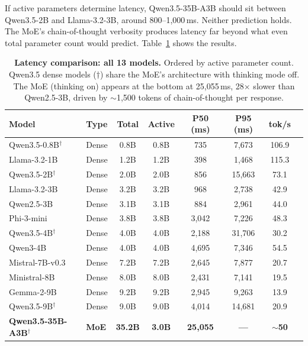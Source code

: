 \documentclass[11pt]{article}
\begin{document}
If active parameters determine latency, Qwen3.5-35B-A3B should sit between Qwen3.5-2B and Llama-3.2-3B, around 800--1,000\,ms.  Neither prediction holds.  The MoE's chain-of-thought verbosity produces latency far beyond what even total parameter count would predict.  Table~\ref{tab:latency-comparison} shows the results.

\begin{table}[t]
\centering
\caption{\textbf{Latency comparison: all 13 models.} Ordered by active parameter count.  Qwen3.5 dense models ($\dagger$) share the MoE's architecture with thinking mode off.  The MoE (thinking on) appears at the bottom at 25,055\,ms, 28$\times$ slower than Qwen2.5-3B, driven by ${\sim}$1,500 tokens of chain-of-thought per response.}
\label{tab:latency-comparison}
\small
\begin{tabular}{llcccccc}
\toprule
\textbf{Model} & \textbf{Type} & \textbf{Total} & \textbf{Active} & \textbf{P50 (ms)} & \textbf{P95 (ms)} & \textbf{tok/s} \\
\midrule
Qwen3.5-0.8B$^\dagger$ & Dense & 0.8B & 0.8B & 735  & 7,673 & 106.9 \\
Llama-3.2-1B & Dense & 1.2B & 1.2B & 398  & 1,468 & 115.3 \\
Qwen3.5-2B$^\dagger$ & Dense & 2.0B & 2.0B & 856  & 15,663 & 73.1 \\
Llama-3.2-3B & Dense & 3.2B & 3.2B & 968  & 2,738 & 42.9 \\
Qwen2.5-3B & Dense & 3.1B & 3.1B & 884  & 2,961 & 44.0 \\
Phi-3-mini & Dense & 3.8B & 3.8B & 3,042 & 7,226 & 48.3 \\
Qwen3.5-4B$^\dagger$ & Dense & 4.0B & 4.0B & 2,188 & 31,706 & 30.2 \\
Qwen3-4B & Dense & 4.0B & 4.0B & 4,695 & 7,346 & 54.5 \\
Mistral-7B-v0.3 & Dense & 7.2B & 7.2B & 2,645 & 7,877 & 20.7 \\
Ministral-8B & Dense & 8.0B & 8.0B & 2,431 & 7,141 & 19.5 \\
Gemma-2-9B & Dense & 9.2B & 9.2B & 2,945 & 9,263 & 13.9 \\
Qwen3.5-9B$^\dagger$ & Dense & 9.0B & 9.0B & 4,014 & 14,681 & 20.9 \\
\midrule
\rowcolor{moepurple!8}
\textbf{Qwen3.5-35B-A3B}$^\dagger$ & \textbf{MoE} & \textbf{35.2B} & \textbf{3.0B} & \textbf{25,055} & \textbf{---} & \textbf{${\sim}$50} \\
\bottomrule
\end{tabular}
\end{table}
\end{document}
